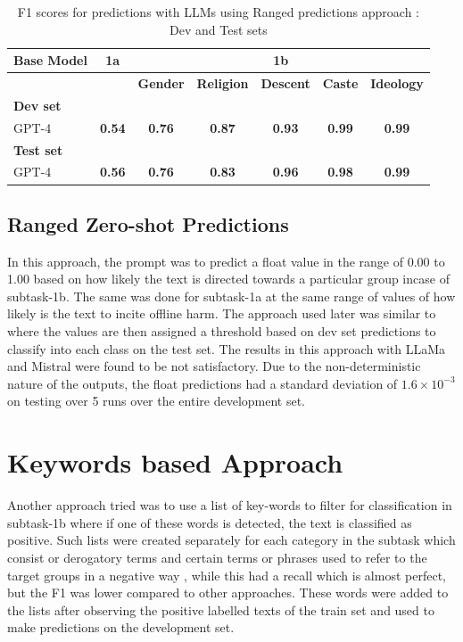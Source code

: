\documentclass[10pt, a4paper]{article}
\begin{document}
\begin{table}[h!]
\begin{center}
\begin{tabular}{|l|c|c|c|c|c|c|}
\hline
\textbf{Base Model} & \textbf{1a} & \multicolumn{5}{c|}{\textbf{1b}} \\
\hline
 & & \textbf{Gender} & \textbf{Religion} & \textbf{Descent} & \textbf{Caste} & \textbf{Ideology} \\
\hline
\textbf{Dev set} & \multicolumn{6}{c|}{\textbf{}} \\
\hline
GPT-4 & \textbf{0.54} & \textbf{0.76} & \textbf{0.87} & \textbf{0.93} & \textbf{0.99} & \textbf{0.99} \\
\hline
\textbf{Test set} & \multicolumn{6}{c|}{\textbf{}} \\
\hline
GPT-4 & \textbf{0.56} & \textbf{0.76} & \textbf{0.83} & \textbf{0.96} & \textbf{0.98} & \textbf{0.99} \\
\hline
\end{tabular}
\caption{F1 scores for predictions with LLMs using Ranged predictions approach : Dev and Test sets}
\label{table:8}
\end{center}
\end{table}

\subsection{Ranged Zero-shot Predictions}

In this approach, the prompt was to predict a float value in the range of 0.00 to 1.00 based on how likely the text is directed towards a particular group incase of subtask-1b. The same was done for subtask-1a at the same range of values of how likely is the text to incite offline harm. The approach used later was similar to \citep{patkar-etal-2023-adityapatkar} where the values are then assigned a threshold based on dev set predictions to classify into each class on the test set. The results in this approach with LLaMa and Mistral were found to be not satisfactory. Due to the non-deterministic nature of the outputs, the float predictions had a standard deviation of $1.6 \times 10^{-3}$ on testing over 5 runs over the entire development set. 

\section{Keywords based Approach}

Another approach tried was to use a list of key-words to filter for classification in subtask-1b where if one of these words is detected, the text is classified as positive. Such lists were created separately for each category in the subtask which consist or derogatory terms and certain terms or phrases used to refer to the target groups in a negative way , while this had a recall which is almost perfect, but the F1 was lower compared to other approaches. These words were added to the lists after observing the positive labelled texts of the train set and used to make predictions on the development set. 
\end{document}
